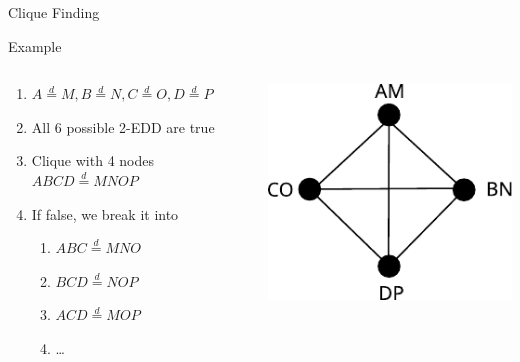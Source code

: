 \documentclass[10pt]{beamer}
\newcommand{\eqdist}{\stackrel{d}{=}}
\begin{document}
\begin{frame}{Clique Finding}
    \begin{exampleblock}{Example}
        \begin{columns}
        \begin{column}{.7\textwidth}
        \begin{enumerate}
            \item $A \eqdist M, B \eqdist N, C \eqdist O, D \eqdist P$
            \item All 6 possible 2-EDD are true
            \item Clique with 4 nodes $ABCD \eqdist MNOP$
            \item If false, we break it into
                \begin{enumerate}
                    \item $ABC \eqdist MNO$
                    \item $BCD \eqdist NOP$
                    \item $ACD \eqdist MOP$
                    \item \ldots
                \end{enumerate}
        \end{enumerate}
        \end{column}
        \begin{column}{.3\textwidth}
            \includegraphics[width=\linewidth]{4clique}
        \end{column}
        \end{columns}
    \end{exampleblock}
    

\end{frame}
\end{document}
